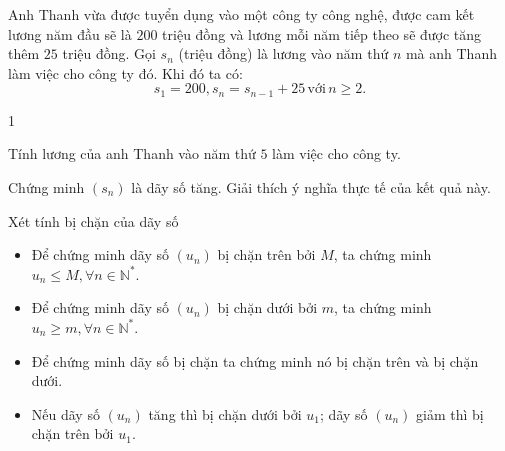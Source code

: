 \begin{vd}
	Anh Thanh vừa được tuyển dụng vào một công ty công nghệ, được cam kết lương năm đầu sẽ là $ 200 $ triệu đồng và lương mỗi năm tiếp theo sẽ được tăng thêm $ 25 $ triệu đồng. Gọi $s_n$ (triệu đồng) là lương vào năm thứ $n$ mà anh Thanh làm việc cho công ty đó. Khi đó ta có:
	$$s_1=200, s_n=s_{n-1}+25\, \text{với}\, n \geq 2.$$
	\begin{enumEX}{1}
		\item Tính lương của anh Thanh vào năm thứ $ 5 $ làm việc cho công ty.
		\item Chứng minh $\left(s_n\right)$ là dãy số tăng. Giải thích ý nghĩa thực tế của kết quả này.
	\end{enumEX}
\end{vd}

\begin{dang}{Xét tính bị chặn của dãy số}
	\begin{itemize}
		\item Để chứng minh dãy số $(u_n)$ bị chặn trên bởi $M$, ta chứng minh $u_n\leq M, \forall n\in \mathbb{N}^*.$
		\item Để chứng minh dãy số $(u_n)$ bị chặn dưới bởi $m$, ta chứng minh $u_n\geq m, \forall n\in \mathbb{N}^*.$
		\item Để chứng minh dãy số bị chặn ta chứng minh nó bị chặn trên và bị chặn dưới.
		\item Nếu dãy số $(u_n)$ tăng thì bị chặn dưới bởi $u_1$; dãy số $(u_n)$ giảm thì bị chặn trên bởi $u_1$.
	\end{itemize}
\end{dang}

